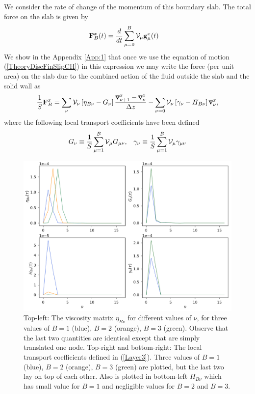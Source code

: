 \documentclass[b5paper,openright,10pt]{book}
\newcommand{\esc}{\!\cdot\!}
\begin{document}
We consider the rate of change of the momentum of this boundary slab.
 The total force on the slab is given by
\begin{align}
{\bf F}^x_B(t)&=\frac{d}{dt} \sum^{B}_{\mu=0}{\cal V}_\mu  {\bf g}^x_\mu(t)
\label{ForceB}
\end{align}
We show in  the Appendix \ref{App:1} that once we  use the equation of
motion (\ref{TheoryDiscFinSlipCH}) in this expression we may write the force
(per unit area)  on the slab due  to the combined action  of the fluid
outside the slab and the solid wall as
\begin{align}
\frac{1}{S}{\bf F}^x_B=  \sum_{\nu} {\cal V}_\nu 
\left[\eta_{B\nu}-G_\nu \right]\frac{\overline{\bf v}^x_{\nu+1}-\overline{\bf v}^x_{\nu}}{\Delta z}
-\sum_{\nu=0} {\cal V}_\nu\left[\gamma_{\nu}-H_{B\nu}\right]\overline{\bf v}^x_\nu,
\label{FBv}
\end{align}
where the following local transport coefficients have been defined
\begin{align}
  G_\nu\equiv \frac{1}{S} \sum^{B}_{\mu=1}{\cal V}_\mu G_{\mu\nu}, &&
\gamma_{\nu}\equiv  \frac{1}{S}\sum^{B}_{\mu=1}{\cal V}_\mu \gamma_{\mu\nu}
\label{Layer3}
\end{align}
\begin{figure}[]
\includegraphics[width=\linewidth]{transportMatrices-17nodes-WALLS}
\caption[The viscosity matrix for different values of $\nu$, for three values of $B$]{Top-left: The viscosity matrix  $\eta_{B\nu}$ for different values
  of  $\nu$, for  three values  of $B=1$  (blue), $B=2$  (orange), $B=3$
  (green). Observe  that the last  two quantities are  identical except
  that are  simply translated one  node. Top-right and bottom-right:  The local
  transport coefficients  defined in  (\ref{Layer3}). Three  values of
  $B=1$ (blue), $B=2$  (orange), $B=3$ (green) are plotted,  but the last
two lay on top of each other. Also is plotted in bottom-left $H_{B\nu}$ which has small value for $B=1$ and negligible values for $B=2$ and $B=3$. }
\label{Fig.Bdependence}
\end{figure}
\end{document}
